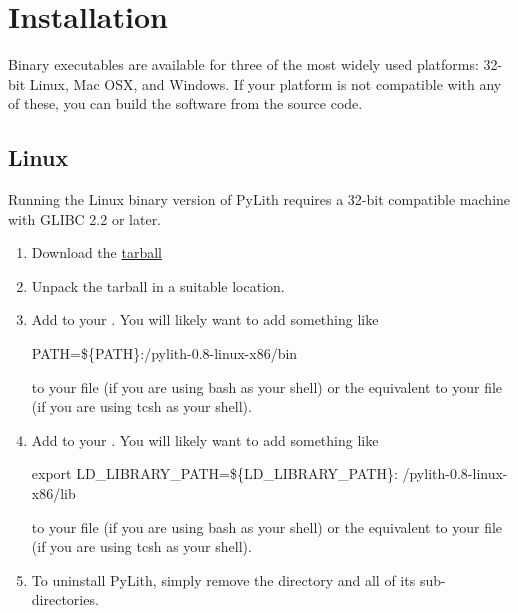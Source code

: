 \section{Installation}

Binary executables are available for three of the most widely used
platforms: 32-bit Linux, Mac OSX, and Windows. If your platform is not
compatible with any of these, you can build the software from the
source code.

\subsection{Linux}

Running the Linux binary version of PyLith requires a 32-bit
compatible machine with GLIBC 2.2 or later.

\begin{enumerate}
\item Download the \href{http://crust.geodynamics.org/~leif/shipping/}{tarball}
\item Unpack the tarball in a suitable location.
  \begin{screen}
    \shellprompt{}
  \end{screen}
\item Add  to your .
  You will likely want to add something like
  \begin{screen}
    PATH=\$\{PATH\}:/pylith-0.8-linux-x86/bin
  \end{screen}
  to your  file (if you are using bash as your shell)
  or the equivalent to your  file (if you are using
  tcsh as your shell).
\item Add to your
  . You will likely want to add something like
  \begin{screen}
    export LD\_LIBRARY\_PATH=\$\{LD\_LIBRARY\_PATH\}:
    /pylith-0.8-linux-x86/lib
  \end{screen}
  to your  file (if you are using bash as your
  shell) or the equivalent to your  file
  (if you are using tcsh as your shell).
\item To uninstall PyLith, simply remove the 
  directory and all of its sub-directories.
\end{enumerate}

